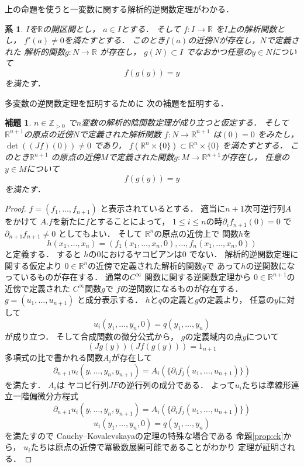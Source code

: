 \documentclass[leqno, a4paper, 12pt]{jsarticle}
\newtheorem{cor}[thm]{系}
\newtheorem{lem}[thm]{補題}
\newcommand{\zz}{\mathbb{Z}}
\newcommand{\rr}{\mathbb{R}}
\begin{document}
上の命題を使うと一変数に関する解析的逆関数定理がわかる．
\begin{cor}
$I$を$\rr$の開区間とし，
$a\in I$とする．
そして
$f: I\to \rr$
を$I$上の解析関数とし，
$f'(a)\neq 0$を満たすとする．
このとき$f(a)$の近傍$N$が存在し，$N$で定義された
解析的関数$g:N\to \rr$
が存在し， $g(N)\subset I$
でなおかつ任意の$y\in N$について
\[
f(g(y))=y
\]
を満たす．
\end{cor}

多変数の逆関数定理を証明するために
次の補題を証明する．
\begin{lem}
$n\in \zz_{>0}$
で$n$変数の解析的陰関数定理が成り立つと仮定する．
そして
$\rr^{n+1}$の原点の近傍$N$で定義された解析関数
$f: N\to \rr^{n+1}$
は$(0)=0$
をみたし，$\det((Jf)(0))\neq 0$
であり，
$f(\rr^{n}\times\{0\})\subset \rr^{n}\times \{0\}$
を満たすとする．
このとき$\rr^{n+1}$
の原点の近傍$M$で定義された関数$g: M\to \rr^{n+1}$が存在し，
任意の$y\in M$について
\[
f(g(y))=y
\]
を満たす．
\end{lem}
\begin{proof}
$f=(f_1, \dots, f_{n+1})$
と表示されているとする．
適当に$n+1$次可逆行列$A$をかけて
$A.f$を新たに$f$とすることによって，
$1\le i\le n$の時$\partial_{i}f_{n+1}(0)=0$
で
$\partial_{n+1}f_{n+1}\neq 0$
としてもよい．
そして
$\rr^{n}$の原点の近傍上で
関数$h$を
\[
h(x_1, \dots, x_n)=( f_1(x_1, \dots, x_n, 0), \dots, f_n(x_1, \dots, x_n, 0))
\]
と定義する．
すると
$h$の$0$におけるヤコビアンは$0$
でない．
解析的逆関数定理に関する仮定より
$0\in \rr^n$の近傍で定義された解析的関数$q$で
あって$h$の逆関数になっているものが存在する．
通常の$C^{\infty}$
関数に関する逆関数定理から
$0\in \rr^{n+1}$の近傍で定義された
$C^{\infty}$関数$g$で
$f$の逆関数になるものが存在する．
$g=(u_1, \dots, u_{n+1})$
と成分表示する．
$h$と$q$の定義と$g$の定義より，
任意の$y$に対して
\[
u_{i}(y_1, \dots, y_n, 0)=q(y_1, \dots, y_n)
\]
が成り立つ．
そして合成関数の微分公式から，
$g$の定義域内の点$y$について
\[
(Jg(y))(Jf(g(y)))=1_{n+1}
\]
多項式の比で書かれる関数$A_{i}$が存在して
\[
\partial_{n+1}u_i(y, \dots, y_n, y_{n+1})
=
A_{i}(\{\partial_{i}f_{j}(u_{1}, \dots, u_{n+1})\})
\]
を満たす．
$A_i$は
ヤコビ行列$JF$の逆行列の成分である．
よって$u_i$たちは準線形連立一階偏微分方程式
\[
\partial_{n+1}u_i(y, \dots, y_n, y_{n+1})
=
A_{i}(\{\partial_{i}f_{j}(u_{1}, \dots, u_{n+1})\})
\]
\[
u_{i}(y_1, \dots, y_n, 0)=q(y_1, \dots, y_n)
\]
を満たすので
Cauchy--Kovalevskayaの定理の特殊な場合である
命題\ref{prop:ck}から，
$u_i$たちは原点の近傍で冪級数展開可能であることがわかり
定理が証明される．
\end{proof}
\end{document}
